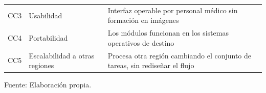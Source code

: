 \begin{table}[H]
\begin{tabular}{p{1.1cm} p{6.2cm} p{5.6cm}}
    CC3 & Usabilidad & Interfaz operable por personal médico sin formación en imágenes \\
    CC4 & Portabilidad & Los módulos funcionan en los sistemas operativos de destino \\
    CC5 & Escalabilidad a otras regiones & Procesa otra región cambiando el conjunto de tareas, sin rediseñar el flujo \\
    \hline
  \end{tabular}
  \begin{minipage}{\textwidth}
    \centering
    \vspace{5pt}
    \normalsize Fuente: Elaboración propia.\\
  \end{minipage}
\end{table}